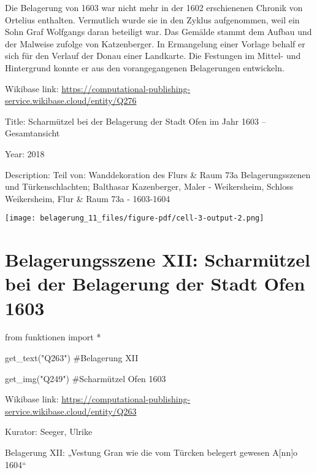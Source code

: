 \documentclass[
  a4paper,
  portrait]{book}
\newenvironment{Shaded}{\begin{snugshade}}{\end{snugshade}}
\newcommand{\CommentTok}[1]{\textcolor[rgb]{0.37,0.37,0.37}{#1}}
\newcommand{\ImportTok}[1]{\textcolor[rgb]{0.00,0.46,0.62}{#1}}
\newcommand{\NormalTok}[1]{\textcolor[rgb]{0.00,0.23,0.31}{#1}}
\newcommand{\OperatorTok}[1]{\textcolor[rgb]{0.37,0.37,0.37}{#1}}
\newcommand{\StringTok}[1]{\textcolor[rgb]{0.13,0.47,0.30}{#1}}
\begin{document}
Die Belagerung von 1603 war nicht mehr in der 1602 erschienenen Chronik
von Ortelius enthalten. Vermutlich wurde sie in den Zyklus aufgenommen,
weil ein Sohn Graf Wolfgangs daran beteiligt war. Das Gemälde stammt dem
Aufbau und der Malweise zufolge von Katzenberger. In Ermangelung einer
Vorlage behalf er sich für den Verlauf der Donau einer Landkarte. Die
Festungen im Mittel- und Hintergrund konnte er aus den vorangegangenen
Belagerungen entwickeln.

Wikibase link:
\url{https://computational-publishing-service.wikibase.cloud/entity/Q276}

Title: Scharmützel bei der Belagerung der Stadt Ofen im Jahr 1603 --
Gesamtansicht

Year: 2018

Description: Teil von: Wanddekoration des Flurs \& Raum 73a
Belagerungsszenen und Türkenschlachten; Balthasar Kazenberger, Maler -
Weikersheim, Schloss Weikersheim, Flur \& Raum 73a - 1603-1604

\texttt{[image: belagerung\_11\_files/figure-pdf/cell-3-output-2.png]}

\chapter{Belagerungsszene XII: Scharmützel bei der Belagerung der Stadt
Ofen
1603}\label{belagerungsszene-xii-scharmuxfctzel-bei-der-belagerung-der-stadt-ofen-1603}

\begin{Shaded}
\begin{Highlighting}[]
\ImportTok{from}\NormalTok{ funktionen }\ImportTok{import} \OperatorTok{*}
\end{Highlighting}
\end{Shaded}

\begin{Shaded}
\begin{Highlighting}[]
\NormalTok{get\_text(}\StringTok{"Q263"}\NormalTok{)}
\CommentTok{\#Belagerung XII}

\NormalTok{get\_img(}\StringTok{"Q249"}\NormalTok{)}
\CommentTok{\#Scharmützel Ofen 1603}
\end{Highlighting}
\end{Shaded}

Wikibase link:
\url{https://computational-publishing-service.wikibase.cloud/entity/Q263}

Kurator: Seeger, Ulrike

Belagerung XII: „Vestung Gran wie die vom Türcken belegert gewesen
A{[}nn{]}o 1604``
\end{document}
